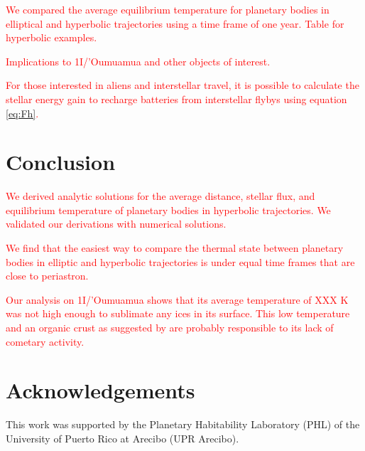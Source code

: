 \documentclass[a4paper,fleqn,usenatbib]{mnras}
\newcommand{\fix}{\textcolor{red}}
\begin{document}
\fix{We compared the average equilibrium temperature for planetary bodies in elliptical and hyperbolic trajectories using a time frame of one year. Table for hyperbolic examples.}

\fix{Implications to 1I/'Oumuamua and other objects of interest.}

\fix{For those interested in aliens and interstellar travel, it is possible to calculate the stellar energy gain to recharge batteries from interstellar flybys using equation \ref{eq:Fh}.} 

\section{Conclusion}
\label{sec:conclusion}

\fix{We derived analytic solutions for the average distance, stellar flux, and equilibrium temperature of planetary bodies in hyperbolic trajectories. We validated our derivations with numerical solutions.}

\fix{We find that the easiest way to compare the thermal state between planetary bodies in elliptic and hyperbolic trajectories is under equal time frames that are close to periastron.}

\fix{Our analysis on 1I/'Oumuamua shows that its average temperature of XXX K was not high enough to sublimate any ices in its surface. This low temperature and an organic crust as suggested by \citet{2017arXiv171206552F} are probably responsible to its lack of cometary activity.}

\section*{Acknowledgements}

This work was supported by the Planetary Habitability Laboratory (PHL) of the University of Puerto Rico at Arecibo (UPR Arecibo).




%
\end{document}
